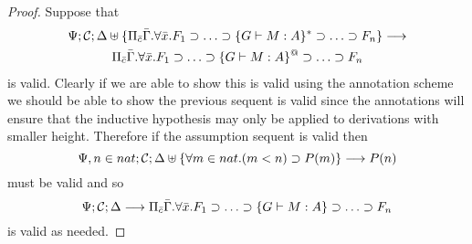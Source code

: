 \documentclass[11pt]{article}
\begin{document}
\begin{proof}
Suppose that 
%
\begin{gather*}
\Psi;\mathcal{C};\Delta\uplus\{\Pi_{\bar{c}}\bar{\Gamma}.\forall \bar{x}. F_1\supset \ldots\supset \{G \vdash M:A\}^*\supset \ldots\supset F_n\}\longrightarrow\\
    {\Pi_{\bar{c}}\bar{\Gamma}.\forall \bar{x}. F_1\supset \ldots\supset \{G \vdash M:A\}^@\supset \ldots\supset F_n}
\end{gather*}
%
is valid.
%
Clearly if we are able to show this is valid using the annotation
scheme we should be able to show the previous sequent is valid since
the annotations will ensure that the inductive hypothesis may only be
applied to derivations with smaller height.
%
Therefore if the assumption sequent is valid then
%
\[
\Psi,n\in nat;\mathcal{C};\Delta\uplus\{\forall m\in nat. (m<n)\supset P(m)\}\longrightarrow P(n)
\]
%
must be valid and so
%
\[
\Psi;\mathcal{C};\Delta\longrightarrow \Pi_{\bar{c}}\bar{\Gamma}.\forall \bar{x}. F_1\supset \ldots\supset \{G \vdash M:A\}\supset \ldots\supset F_n
\]
%
is valid as needed.
\end{proof}
\end{document}
